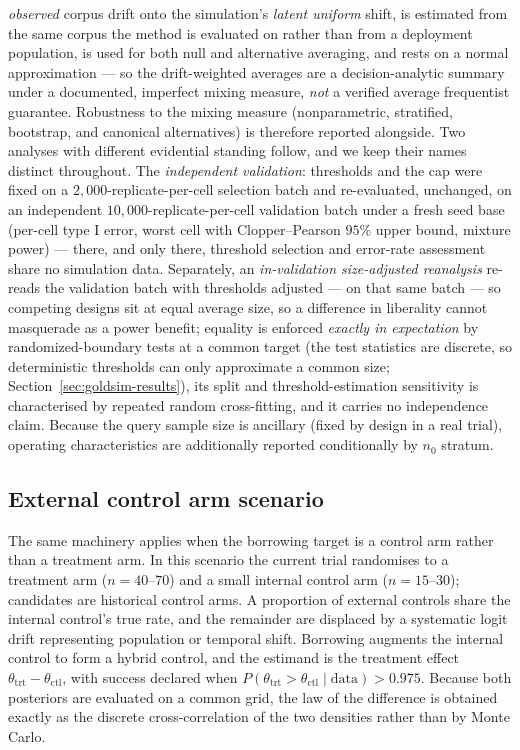 \documentclass[11pt]{article}
\begin{document}
\emph{observed} corpus drift onto the simulation's \emph{latent uniform}
shift, is estimated from the same corpus the method is evaluated on rather
than from a deployment population, is used for both null and alternative
averaging, and rests on a normal approximation --- so the drift-weighted
averages are a decision-analytic summary under a documented, imperfect
mixing measure, \emph{not} a verified average frequentist guarantee.
Robustness to the mixing measure (nonparametric, stratified, bootstrap,
and canonical alternatives) is therefore reported alongside. Two
analyses with different evidential standing follow, and we keep their
names distinct throughout. The \emph{independent validation}: thresholds
and the cap were fixed on a $2{,}000$-replicate-per-cell selection batch
and re-evaluated, unchanged, on an independent
$10{,}000$-replicate-per-cell validation batch under a fresh seed base
(per-cell type I error, worst cell with Clopper--Pearson $95\%$ upper
bound, mixture power) --- there, and only there, threshold selection and
error-rate assessment share no simulation data. Separately, an
\emph{in-validation size-adjusted reanalysis} re-reads the validation
batch with thresholds adjusted --- on that same batch --- so competing
designs sit at equal average size, so a difference in liberality cannot
masquerade as a power benefit; equality is enforced \emph{exactly in
expectation} by randomized-boundary tests at a common target (the test
statistics are discrete, so deterministic thresholds can only
approximate a common size; Section~\ref{sec:goldsim-results}), its
split and threshold-estimation sensitivity is
characterised by repeated random cross-fitting, and it carries no
independence claim. Because the query sample size is ancillary (fixed by
design in a real trial), operating characteristics are additionally
reported conditionally by $n_0$ stratum.

\subsection{External control arm scenario}
\label{sec:ecmethods}
The same machinery applies when the borrowing target is a control arm rather
than a treatment arm. In this scenario the current trial randomises to a
treatment arm ($n = 40$--$70$) and a small internal control arm ($n = 15$--$30$);
candidates are historical control arms. A proportion of external controls share
the internal control's true rate, and the remainder are displaced by a
systematic logit drift representing population or temporal shift. Borrowing
augments the internal control to form a hybrid control, and the estimand is the
treatment effect $\theta_{\mathrm{trt}} - \theta_{\mathrm{ctl}}$, with success
declared when $P(\theta_{\mathrm{trt}} > \theta_{\mathrm{ctl}} \mid \text{data})
> 0.975$. Because both posteriors are evaluated on a common grid, the law of the
difference is obtained exactly as the discrete cross-correlation of the two
densities rather than by Monte Carlo.
\end{document}
